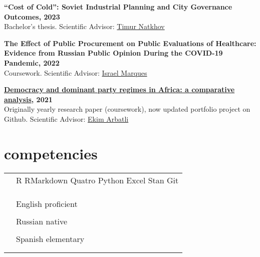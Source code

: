 \documentclass[11pt]{article}
\newcommand{\entry}[4]{{{\textbf{#1}}} \hfill #3 \\ #2 \hfill #4}
\newcommand{\tableentry}[3]{\textsc{#1} & #2\expandafter\ifstrequal\expandafter{#3}{}{\\}{\\[6pt]}}
\begin{document}
\smallskip

\entry{``Cost of Cold'': Soviet Industrial Planning and City Governance Outcomes, 2023}{Bachelor's thesis. Scientific Advisor: \href{https://www.hse.ru/en/staff/natkhov}{Timur Natkhov}}{}{}

\smallskip

\entry{The Effect of Public Procurement on Public Evaluations of Healthcare: Evidence from Russian Public
Opinion During the COVID-19 Pandemic, 2022}{Coursework. Scientific Advisor: \href{https://israelmarques.com/}{Israel Marques}}{}{}

\smallskip

\entry{\href{https://github.com/sapolikanov/domparty}{Democracy and dominant party regimes in Africa: a comparative analysis}, 2021}{Originally yearly research paper (coursework), now updated portfolio project on Github. Scientific Advisor: \href{https://www.hse.ru/en/org/persons/61713365}{Ekim Arbatli}}{}{}

\section{competencies}
\begin{supertabular}{rl}
  \tableentry{\footnotesize\faCode}{R \textperiodcentered{} RMarkdown \textperiodcentered{} Quatro \textperiodcentered{} Python \textperiodcentered{} Excel \textperiodcentered{} Stan \textperiodcentered{} Git }{}
  \tableentry{}{}{}

  \tableentry{\footnotesize\faLanguage}{English \textperiodcentered{} proficient}{}
  \tableentry{}{Russian \textperiodcentered{} native}{}
  \tableentry{}{Spanish \textperiodcentered{} elementary}{}

\end{supertabular}
\end{document}
